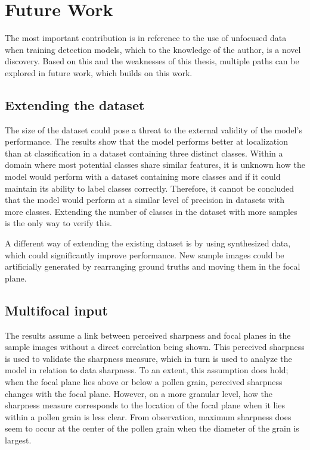 \section{Future Work}
The most important contribution is in reference to the use of unfocused data when training detection models, which to the knowledge of the author, is a novel discovery.
Based on this and the weaknesses of this thesis, multiple paths can be explored in future work, which builds on this work.

\subsection*{Extending the dataset}
The size of the dataset could pose a threat to the external validity of the model's performance.
The results show that the model performs better at localization than at classification in a dataset containing three distinct classes.
Within a domain where most potential classes share similar features, it is unknown how the model would perform with a dataset containing more classes and if it could maintain its ability to label classes correctly.
Therefore, it cannot be concluded that the model would perform at a similar level of precision in datasets with more classes.
Extending the number of classes in the dataset with more samples is the only way to verify this.

A different way of extending the existing dataset is by using synthesized data, which could significantly improve performance.
New sample images could be artificially generated by rearranging ground truths and moving them in the focal plane.

\subsection*{Multifocal input}
The results assume a link between perceived sharpness and focal planes in the sample images without a direct correlation being shown.
This perceived sharpness is used to validate the sharpness measure, which in turn is used to analyze the model in relation to data sharpness.
To an extent, this assumption does hold; when the focal plane lies above or below a pollen grain, perceived sharpness changes with the focal plane.
However, on a more granular level, how the sharpness measure corresponds to the location of the focal plane when it lies within a pollen grain is less clear.
From observation, maximum sharpness does seem to occur at the center of the pollen grain when the diameter of the grain is largest.

